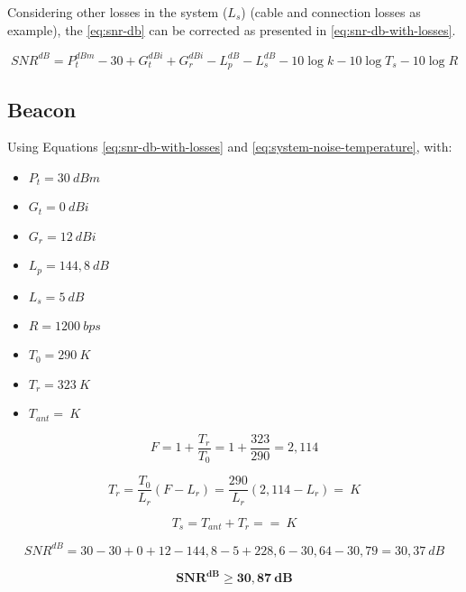 Considering other losses in the system ($L_{s}$) (cable and connection losses as example), the \autoref{eq:snr-db} can be corrected as presented in \autoref{eq:snr-db-with-losses}.

\begin{equation} \label{eq:snr-db-with-losses}
    SNR^{dB} = P_{t}^{dBm} - 30 + G_{t}^{dBi} + G_{r}^{dBi} - L_{p}^{dB} - L_{s}^{dB} - 10\log k - 10\log T_{s} - 10\log R
\end{equation}

\subsection{Beacon}

Using Equations \ref{eq:snr-db-with-losses} and \ref{eq:system-noise-temperature}, with:

\begin{itemize}
    \item $P_{t} = 30\ dBm$
    \item $G_{t} = 0\ dBi$
    \item $G_{r} = 12\ dBi$
    \item $L_{p} = 144,8\ dB$
    \item $L_{s} = 5\ dB$
    \item $R = 1200\ bps$
    \item $T_{0} = 290\ K$
    \item $T_{r} = 323\ K$
    \item $T_{ant} = \ K$
\end{itemize}

\begin{equation}
    F = 1 + \frac{T_{r}}{T_{0}} = 1 + \frac{323}{290} = 2,114
\end{equation}

\begin{equation}
    T_{r} = \frac{T_{0}}{L_{r}} (F - L_{r}) = \frac{290}{L_{r}} (2,114 - L_{r}) = \ K
\end{equation}

\begin{equation}
    T_{s} = T_{ant} + T_{r} =  = \ K
\end{equation}

\begin{equation}
    SNR^{dB} = 30 - 30 + 0 + 12 - 144,8 - 5 + 228,6 - 30,64 - 30,79 = 30,37\ dB
\end{equation}

\begin{equation}
\mathbf{SNR^{dB} \geq 30,87\ dB}
\end{equation}

